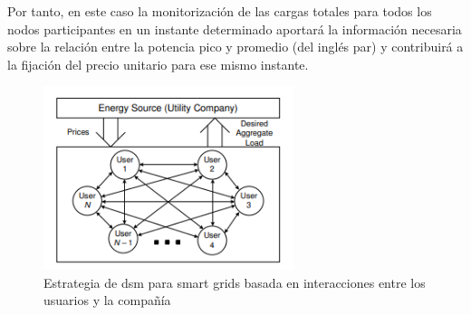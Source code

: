Por tanto, en este caso la monitorización de las cargas totales para todos los nodos participantes en un instante determinado aportará la información necesaria sobre la relación entre la potencia pico y promedio (del inglés \gls{par}) y contribuirá a la fijación del precio unitario para ese mismo instante. \cite{pricing} 

\vspace{3mm}

\begin{figure}[h]
  \centering
  \includegraphics[width=0.65\textwidth]{img/teoria/dsm2.png}
  \caption{Estrategia de \gls{dsm} para smart grids basada en interacciones entre los usuarios y la compañía \cite{pricing}}
  \label{fig:dsm2}
\end{figure}

\vspace{3mm}


























